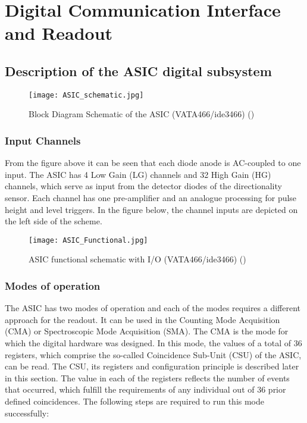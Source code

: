 \section{Digital Communication Interface and Readout}
\label{sec:logic_design}


\subsection{Description of the ASIC digital subsystem}
\label{sec:descriptionASIC}


\begin{figure}[H]
    \centering
    \texttt{[image: ASIC\_schematic.jpg]}
    \caption[]{Block Diagram Schematic of the ASIC (VATA466/ide3466) (\cite{Meier2016VATA466}) }
    \label{fig:ASIC_schematic}
\end{figure}

\subsubsection{Input Channels}

From the figure above it can be seen that each diode anode is AC-coupled to one input. The ASIC has 4 Low Gain (LG) channels and 32 High Gain (HG) channels, which serve as input from the detector diodes of the directionality sensor. Each channel has one pre-amplifier and an analogue processing for pulse height and level triggers. In the figure below, the channel inputs are depicted on the left side of the scheme.

\begin{figure}[H]
    \centering
    \texttt{[image: ASIC\_Functional.jpg]}
    \caption[]{ASIC functional schematic with I/O (VATA466/ide3466) (\cite{Meier2016VATA466}) }
    \label{fig:ASIC_Functional}
\end{figure}

\subsubsection{Modes of operation}

The ASIC has two modes of operation and each of the modes requires a different approach for the readout. It can be used in the Counting Mode Acquisition (CMA) or Spectroscopic Mode Acquisition (SMA). 
\newline
The CMA is the mode for which the digital hardware was designed. In this mode, the values of a total of 36 registers, which comprise the so-called Coincidence Sub-Unit (CSU) of the ASIC, can be read. The CSU, its registers and configuration principle is described later in this section. The value in each of the registers reflects the number of events that occurred, which fulfill the requirements of any individual out of 36 prior defined coincidences.
\newline
The following steps are required to run this mode successfully:






